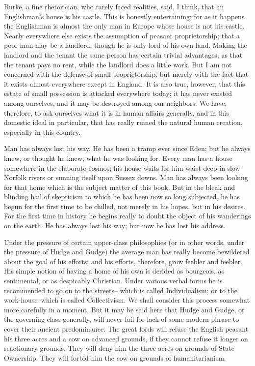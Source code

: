 \documentclass[final,10pt,letterpaper,twocolumn,openany]{book}
\begin{document}
Burke, a fine rhetorician, who rarely faced realities, said, I think, that
an Englishman's house is his castle. This is honestly entertaining; for as it
happens the Englishman is almost the only man in Europe whose house is
not his castle. Nearly everywhere else exists the assumption of peasant
proprietorship; that a poor man may be a landlord, though he is only lord
of his own land. Making the landlord and the tenant the same person has
certain trivial advantages, as that the tenant pays no rent, while the
landlord does a little work. But I am not concerned with the defense of
small proprietorship, but merely with the fact that it exists almost
everywhere except in England. It is also true, however, that this estate of
small possession is attacked everywhere today; it has never existed among
ourselves, and it may be destroyed among our neighbors. We have,
therefore, to ask ourselves what it is in human affairs generally, and in this
domestic ideal in particular, that has really ruined the natural human
creation, especially in this country.

Man has always lost his way. He has been a tramp ever since Eden; but
he always knew, or thought he knew, what he was looking for. Every man
has a house somewhere in the elaborate cosmos; his house waits for him
waist deep in slow Norfolk rivers or sunning itself upon Sussex downs.
Man has always been looking for that home which is the subject matter of
this book. But in the bleak and blinding hail of skepticism to which he has
been now so long subjected, he has begun for the first time to be chilled,
not merely in his hopes, but in his desires. For the first time in history he
begins really to doubt the object of his wanderings on the earth. He has
always lost his way; but now he has lost his address.

Under the pressure of certain upper-class philosophies (or in other
words, under the pressure of Hudge and Gudge) the average man has
really become bewildered about the goal of his efforts; and his efforts,
therefore, grow feebler and feebler. His simple notion of having a home of
his own is derided as bourgeois, as sentimental, or as despicably Christian.
Under various verbal forms he is recommended to go on to the streets--
which is called Individualism; or to the work-house--which is called
Collectivism. We shall consider this process somewhat more carefully in a
moment. But it may be said here that Hudge and Gudge, or the governing
class generally, will never fail for lack of some modern phrase to cover
their ancient predominance. The great lords will refuse the English peasant
his three acres and a cow on advanced grounds, if they cannot refuse it
longer on reactionary grounds. They will deny him the three acres on
grounds of State Ownership. They will forbid him the cow on grounds of
humanitarianism.
\end{document}
